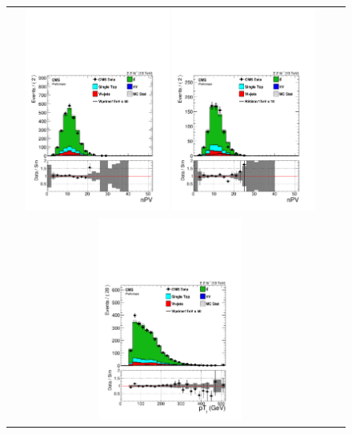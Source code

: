  \begin{figure}[htbp]
 \centering
 \begin{tabular}{cc}
 \includegraphics[width=0.45\textwidth]{chapters/Chapter8-EventSelection/Figures/WVanalysis/ControlPlots_TTbar/mu/nPV_0}
 \includegraphics[width=0.45\textwidth]{chapters/Chapter8-EventSelection/Figures/WVanalysis/ControlPlots_TTbar/el/nPV_0}\\
 \includegraphics[width=0.45\textwidth]{chapters/Chapter8-EventSelection/Figures/WVanalysis/ControlPlots_TTbar/mu/l_pt_0}

\end{tabular}
\end{figure}
